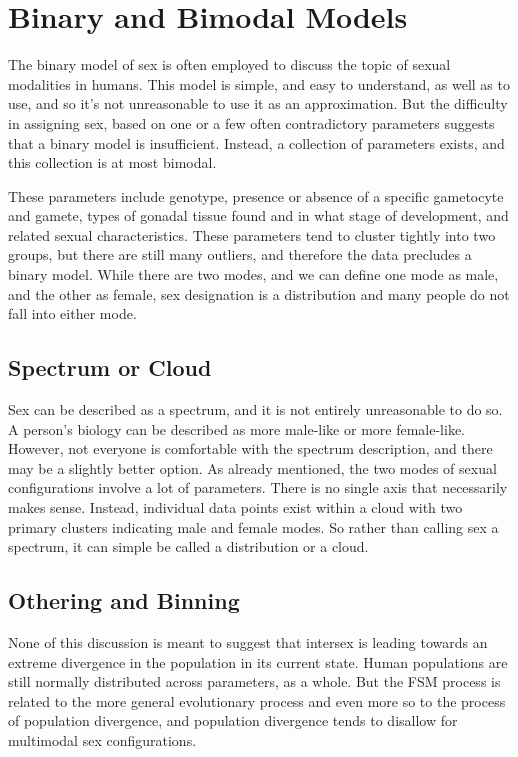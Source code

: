 \documentclass{article}
\begin{document}
\section{Binary and Bimodal Models}
The binary model of sex is often employed to discuss the topic of sexual modalities in humans. This model is simple, and easy to understand, as well as to use, and so it's not unreasonable to use it as an approximation. But the difficulty in assigning sex, based on one or a few often contradictory parameters suggests that a binary model is insufficient\cite{Legato2018}. Instead, a collection of parameters exists, and this collection is at most bimodal.

These parameters include genotype, presence or absence of a specific gametocyte and gamete, types of gonadal tissue found and in what stage of development, and related sexual characteristics. These parameters tend to cluster tightly into two groups, but there are still many outliers, and therefore the data precludes a binary model. While there are two modes, and we can define one mode as male, and the other as female, sex designation is a distribution and many people do not fall into either mode.
\subsection{Spectrum or Cloud}
Sex can be described as a spectrum, and it is not entirely unreasonable to do so. A person's biology can be described as more male-like or more female-like. However, not everyone is comfortable with the spectrum description, and there may be a slightly better option. As already mentioned, the two modes of sexual configurations involve a lot of parameters. There is no single axis that necessarily makes sense. Instead, individual data points exist within a cloud with two primary clusters indicating male and female modes. So rather than calling sex a spectrum, it can simple be called a distribution or a cloud. 
\subsection{Othering and Binning}
None of this discussion is meant to suggest that intersex is leading towards an extreme divergence in the population in its current state. Human populations are still normally distributed across parameters, as a whole. But the FSM process is related to the more general evolutionary process and even more so to the process of population divergence, and population divergence tends to disallow for multimodal sex configurations. 
\end{document}
